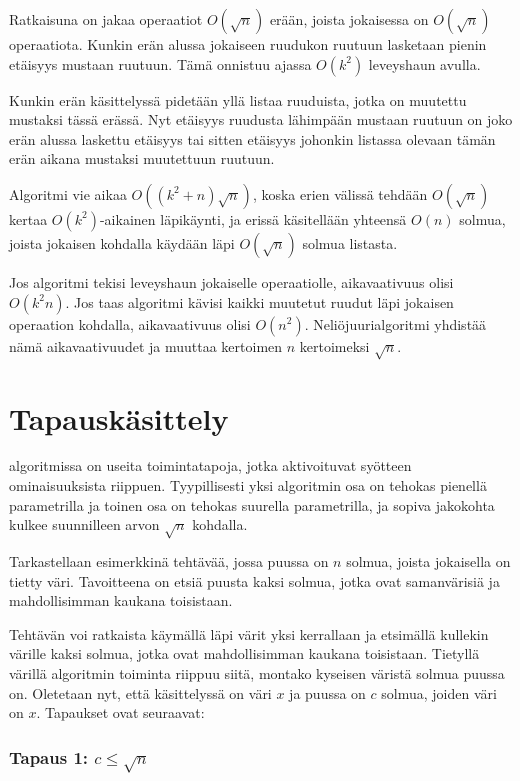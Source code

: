 Ratkaisuna on jakaa operaatiot $O(\sqrt n)$ erään,
joista jokaisessa on $O(\sqrt n)$ operaatiota.
Kunkin erän alussa jokaiseen ruudukon ruutuun
lasketaan pienin etäisyys mustaan ruutuun.
Tämä onnistuu ajassa $O(k^2)$ leveyshaun avulla.

Kunkin erän käsittelyssä pidetään yllä listaa ruuduista,
jotka on muutettu mustaksi tässä erässä.
Nyt etäisyys ruudusta lähimpään mustaan ruutuun
on joko erän alussa laskettu etäisyys tai sitten
etäisyys johonkin listassa olevaan tämän erän aikana mustaksi
muutettuun ruutuun.

Algoritmi vie aikaa $O((k^2+n) \sqrt n)$,
koska erien välissä tehdään $O(\sqrt n)$ kertaa
$O(k^2)$-aikainen läpikäynti, ja
erissä käsitellään yhteensä $O(n)$ solmua,
joista jokaisen kohdalla käydään läpi
$O(\sqrt n)$ solmua listasta.

Jos algoritmi tekisi leveyshaun jokaiselle operaatiolle,
aikavaativuus olisi $O(k^2 n)$.
Jos taas algoritmi kävisi kaikki muutetut ruudut läpi
jokaisen operaation kohdalla,
aikavaativuus olisi $O(n^2)$.
Neliöjuurialgoritmi yhdistää nämä aikavaativuudet
ja muuttaa kertoimen $n$ kertoimeksi $\sqrt n$.

\section{Tapauskäsittely}


 algoritmissa on useita
toimintatapoja, jotka aktivoituvat syötteen
ominaisuuksista riippuen.
Tyypillisesti yksi algoritmin osa on tehokas
pienellä parametrilla
ja toinen osa on tehokas suurella parametrilla,
ja sopiva jakokohta kulkee suunnilleen arvon $\sqrt n$ kohdalla.

Tarkastellaan esimerkkinä tehtävää, jossa
puussa on $n$ solmua, joista jokaisella on tietty väri.
Tavoitteena on etsiä puusta kaksi solmua,
jotka ovat samanvärisiä ja mahdollisimman
kaukana toisistaan.

Tehtävän voi ratkaista
käymällä läpi värit yksi kerrallaan ja
etsimällä kullekin värille kaksi solmua, jotka ovat
mahdollisimman kaukana toisistaan.
Tietyllä värillä algoritmin toiminta riippuu siitä,
montako kyseisen väristä solmua puussa on.
Oletetaan nyt, että käsittelyssä on väri $x$
ja puussa on $c$ solmua, joiden väri on $x$.
Tapaukset ovat seuraavat:

\subsubsection*{Tapaus 1: $c \le \sqrt n$}

